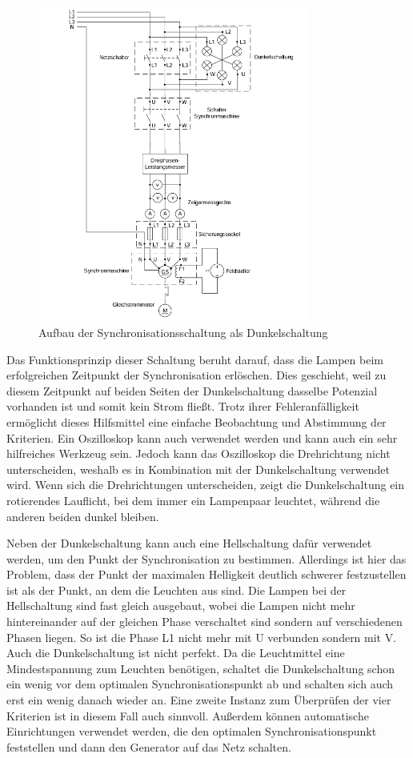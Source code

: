 \documentclass{report}
\begin{document}
\begin{figure}[!ht]
	\centering
	\includegraphics[width=0.8\textwidth]{./assets/img/dunkelschaltung_aufbau.png}
	\caption{Aufbau der Synchronisationsschaltung als Dunkelschaltung}
	\label{fig:dunkelschaltung_aufbau}
\end{figure}

Das Funktionsprinzip dieser Schaltung beruht darauf, dass die Lampen beim erfolgreichen Zeitpunkt der Synchronisation erlöschen. Dies geschieht, weil zu diesem Zeitpunkt auf beiden Seiten der Dunkelschaltung dasselbe Potenzial vorhanden ist und somit kein Strom fließt. Trotz ihrer Fehleranfälligkeit ermöglicht dieses Hilfsmittel eine einfache Beobachtung und Abstimmung der Kriterien. Ein Oszilloskop kann auch verwendet werden und kann auch ein sehr hilfreiches Werkzeug sein. Jedoch kann das Oszilloskop die Drehrichtung nicht unterscheiden, weshalb es in Kombination mit der Dunkelschaltung verwendet wird. Wenn sich die Drehrichtungen unterscheiden, zeigt die Dunkelschaltung ein rotierendes Lauflicht, bei dem immer ein Lampenpaar leuchtet, während die anderen beiden dunkel bleiben.

Neben der Dunkelschaltung kann auch eine Hellschaltung dafür verwendet werden, um den Punkt der Synchronisation zu bestimmen. Allerdings ist hier das Problem, dass der Punkt der maximalen Helligkeit deutlich schwerer festzustellen ist als der Punkt, an dem die Leuchten aus sind. Die Lampen bei der Hellschaltung sind fast gleich ausgebaut, wobei die Lampen nicht mehr hintereinander auf der gleichen Phase verschaltet sind sondern auf verschiedenen Phasen liegen. So ist die Phase L1 nicht mehr mit U verbunden sondern mit V.
Auch die Dunkelschaltung ist nicht perfekt. Da die Leuchtmittel eine Mindestspannung zum Leuchten benötigen, schaltet die Dunkelschaltung schon ein wenig vor dem optimalen Synchronisationspunkt ab und schalten sich auch erst ein wenig danach wieder an. Eine zweite Instanz zum Überprüfen der vier Kriterien ist in diesem Fall auch sinnvoll. Außerdem können automatische Einrichtungen verwendet werden, die den optimalen Synchronisationspunkt feststellen und dann den Generator auf das Netz schalten.
\end{document}
